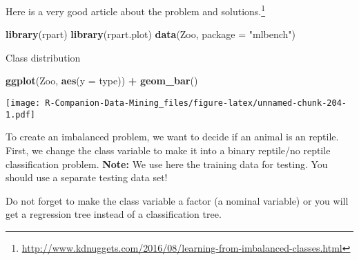 \documentclass[
  notitlepage]{book}
\newenvironment{Shaded}{\begin{snugshade}}{\end{snugshade}}
\newcommand{\DataTypeTok}[1]{\textcolor[rgb]{0.13,0.29,0.53}{#1}}
\newcommand{\ErrorTok}[1]{\textcolor[rgb]{0.64,0.00,0.00}{\textbf{#1}}}
\newcommand{\KeywordTok}[1]{\textcolor[rgb]{0.13,0.29,0.53}{\textbf{#1}}}
\newcommand{\NormalTok}[1]{#1}
\newcommand{\OperatorTok}[1]{\textcolor[rgb]{0.81,0.36,0.00}{\textbf{#1}}}
\newcommand{\OtherTok}[1]{\textcolor[rgb]{0.56,0.35,0.01}{#1}}
\newcommand{\StringTok}[1]{\textcolor[rgb]{0.31,0.60,0.02}{#1}}
\DeclareRobustCommand{\href}[2]{#2\footnote{\url{#1}}}
\begin{document}
Here is a very good \href{http://www.kdnuggets.com/2016/08/learning-from-imbalanced-classes.html}{article about the problem and
solutions.}

\begin{Shaded}
\begin{Highlighting}[]
\KeywordTok{library}\NormalTok{(rpart)}
\KeywordTok{library}\NormalTok{(rpart.plot)}
\KeywordTok{data}\NormalTok{(Zoo, }\DataTypeTok{package =} \StringTok{"mlbench"}\NormalTok{)}
\end{Highlighting}
\end{Shaded}

Class distribution

\begin{Shaded}
\begin{Highlighting}[]
\KeywordTok{ggplot}\NormalTok{(Zoo, }\KeywordTok{aes}\NormalTok{(}\DataTypeTok{y =}\NormalTok{ type)) }\OperatorTok{+}\StringTok{ }\KeywordTok{geom\_bar}\NormalTok{()}
\end{Highlighting}
\end{Shaded}

\texttt{[image: R-Companion-Data-Mining\_files/figure-latex/unnamed-chunk-204-1.pdf]}

To create an imbalanced problem, we want to decide if an animal is an
reptile. First, we change the class variable to make it into a binary
reptile/no reptile classification problem. \textbf{Note:} We use here the
training data for testing. You should use a separate testing data set!

\begin{Shaded}
\end{Shaded}

Do not forget to make the class variable a factor (a nominal variable)
or you will get a regression tree instead of a classification tree.
\end{document}

